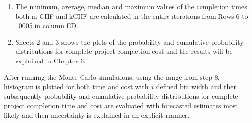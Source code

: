 \begin{enumerate}
	\item The minimum, average, median and maximum values of the completion times both in CHF and kCHF are calculated in the entire iterations from Rows 6 to 10005 in column ED.
	
	\item Sheets 2 and 3 shows the plots of the probability and cumulative probability distributions for complete project completion cost and the results will be explained in Chapter 6.
	
	
\end{enumerate}

After running the Monte-Carlo simulations, using the range from step 8, histogram is plotted for both time and cost with a defined bin width and then subsequently probability and cumulative probability distributions for complete project completion time and cost are evaluated with forecasted estimates most likely and then uncertainty is explained in an explicit manner.
